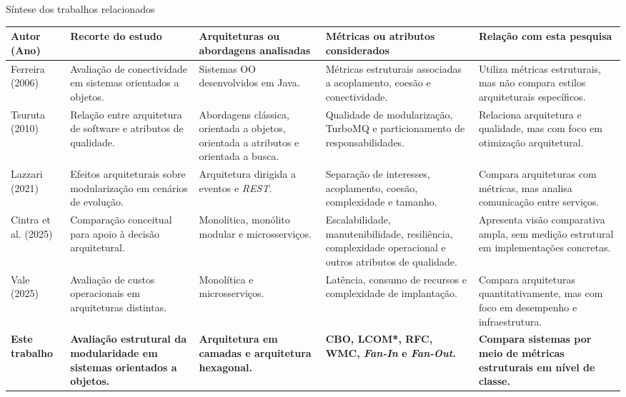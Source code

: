\begin{landscape}
\begin{quadro}[htb]
\centering
\caption{Síntese dos trabalhos relacionados}
\label{quad:sintese-trabalhos-relacionados}
\small
\begin{tabularx}{\linewidth}{|p{2.5cm}|X|X|X|X|}
\hline
\textbf{Autor (Ano)} &
\textbf{Recorte do estudo} &
\textbf{Arquiteturas ou abordagens analisadas} &
\textbf{Métricas ou atributos considerados} &
\textbf{Relação com esta pesquisa} \\ \hline

Ferreira (2006) &
Avaliação de conectividade em sistemas orientados a objetos. &
Sistemas OO desenvolvidos em Java. &
Métricas estruturais associadas a acoplamento, coesão e conectividade. &
Utiliza métricas estruturais, mas não compara estilos arquiteturais específicos. \\ \hline

Tsuruta (2010) &
Relação entre arquitetura de software e atributos de qualidade. &
Abordagens clássica, orientada a objetos, orientada a atributos e orientada a busca. &
Qualidade de modularização, TurboMQ e particionamento de responsabilidades. &
Relaciona arquitetura e qualidade, mas com foco em otimização arquitetural. \\ \hline

Lazzari (2021) &
Efeitos arquiteturais sobre modularização em cenários de evolução. &
Arquitetura dirigida a eventos e \textit{REST}. &
Separação de interesses, acoplamento, coesão, complexidade e tamanho. &
Compara arquiteturas com métricas, mas analisa comunicação entre serviços. \\ \hline

Cintra et al. (2025) &
Comparação conceitual para apoio à decisão arquitetural. &
Monolítica, monólito modular e microsserviços. &
Escalabilidade, manutenibilidade, resiliência, complexidade operacional e outros atributos de qualidade. &
Apresenta visão comparativa ampla, sem medição estrutural em implementações concretas. \\ \hline

Vale (2025) &
Avaliação de custos operacionais em arquiteturas distintas. &
Monolítica e microsserviços. &
Latência, consumo de recursos e complexidade de implantação. &
Compara arquiteturas quantitativamente, mas com foco em desempenho e infraestrutura. \\ \hline

\textbf{Este trabalho} &
\textbf{Avaliação estrutural da modularidade em sistemas orientados a objetos.} &
\textbf{Arquitetura em camadas e arquitetura hexagonal.} &
\textbf{CBO, LCOM*, RFC, WMC, \textit{Fan-In} e \textit{Fan-Out}.} &
\textbf{Compara sistemas por meio de métricas estruturais em nível de classe.} \\ \hline

\end{tabularx}

\vspace{0.1cm}
\par
{}
\end{quadro}
\end{landscape}

